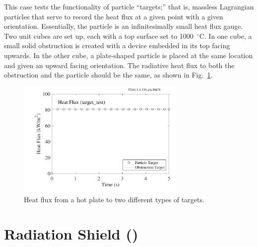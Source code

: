 \documentclass[11pt]{book}
\begin{document}
This case tests the functionality of particle ``targets;'' that is, massless Lagrangian particles that serve to record the heat flux at a given point with a given orientation. Essentially, the particle is an infinitesimally small heat flux gauge. Two unit cubes are set up, each with a top surface set to 1000~$^\circ$C. In one cube, a small solid obstruction is created with a device embedded in its top facing upwards. In the other cube, a plate-shaped particle is placed at the same location and given an upward facing orientation. The radiative heat flux to both the obstruction and the particle should be the same, as shown in Fig.~\ref{target_test_plot}.
\begin{figure}[ht]
\centering
\includegraphics[width=3.2in]{SCRIPT_FIGURES/target_test}
\caption[The  case]{Heat flux from a hot plate to two different types of targets.}
\label{target_test_plot}
\end{figure}



\section{Radiation Shield (\texorpdfstring{}{radiation\_shield}) }
\label{radiation_shield}
\end{document}

